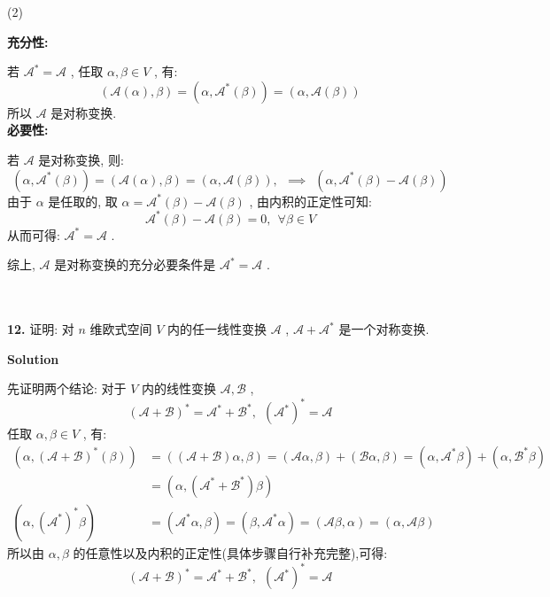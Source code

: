 \documentclass[11pt,a4paper,openany,oneside]{book}
\newcommand\Solution{\noindent\textbf{\textsf{Solution}}\par\medskip}
\begin{document}
(2)

\textbf{充分性:}

若 $ \mathcal{A}^* = \mathcal{A} $ , 任取 $ \alpha, \beta \in V $ , 有:
 $$  (\mathcal{A}(\alpha), \beta) = (\alpha, \mathcal{A}^*(\beta)) = (\alpha, \mathcal{A}(\beta))  $$ 
所以 $ \mathcal{A} $ 是对称变换. \\

\textbf{必要性:}

若 $ \mathcal{A} $ 是对称变换, 则:
 $$  (\alpha, \mathcal{A}^*(\beta)) = (\mathcal{A}(\alpha), \beta) = (\alpha, \mathcal{A}(\beta)), \ \ \implies \ \ (\alpha, \mathcal{A}^*(\beta) - \mathcal{A}(\beta))  $$ 
由于 $ \alpha $ 是任取的, 取 $ \alpha = \mathcal{A}^*(\beta) - \mathcal{A}(\beta)  $ , 由内积的正定性可知:
 $$  \mathcal{A}^*(\beta) - \mathcal{A}(\beta) = 0, \ \ \forall \beta \in V  $$ 
从而可得:  $ \mathcal{A}^* = \mathcal{A} $ .

综上,  $ \mathcal{A} $ 是对称变换的充分必要条件是 $ \mathcal{A}^* = \mathcal{A} $ . \\  \\  \\







\begin{myexample}
	\textbf{12.} 证明: 对 $ n $ 维欧式空间 $ V $ 内的任一线性变换 $ \mathcal{A} $ ,  $ \mathcal{A}+\mathcal{A}^* $ 是一个对称变换.
\end{myexample}
\Solution 

先证明两个结论: 对于 $ V $ 内的线性变换 $ \mathcal{A}, \mathcal{B} $ ,
 $$  (\mathcal{A}+\mathcal{B})^* = \mathcal{A}^* + \mathcal{B}^*, \ \ (\mathcal{A}^*)^* = \mathcal{A}  $$ 
任取 $ \alpha, \beta \in V $ , 有:
\begin{align*}
(\alpha, (\mathcal{A}+\mathcal{B})^*(\beta)) &= ((\mathcal{A+B})\alpha, \beta) = (\mathcal{A}\alpha, \beta) + (\mathcal{B}\alpha, \beta) = (\alpha, \mathcal{A}^*\beta) + (\alpha, \mathcal{B}^*\beta) \\
&= (\alpha, (\mathcal{A}^* + \mathcal{B}^*)\beta) \\ 
(\alpha, (\mathcal{A}^*)^*\beta) &= (\mathcal{A}^*\alpha, \beta) = (\beta, \mathcal{A}^*\alpha) = (\mathcal{A}\beta, \alpha) = (\alpha, \mathcal{A}\beta) 
\end{align*}
所以由 $ \alpha, \beta $ 的任意性以及内积的正定性(具体步骤自行补充完整),可得: 
 $$ (\mathcal{A}+\mathcal{B})^* = \mathcal{A}^* + \mathcal{B}^*, \ \ (\mathcal{A}^*)^* = \mathcal{A} $$ 
\end{document}
